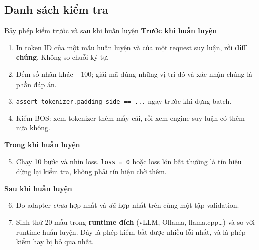 \subsection{Danh sách kiểm tra}
\label{ssec:boundary_checklist}

\begin{checklist}{Bảy phép kiểm trước và sau khi huấn luyện}
\textbf{Trước khi huấn luyện}
\begin{enumerate}
	\item In token ID của một mẫu huấn luyện và của một request suy luận, rồi \textbf{diff chúng}. Không so chuỗi ký tự.
	\item Đếm số nhãn khác $-100$; giải mã đúng những vị trí đó và xác nhận chúng là phần đáp án.
	\item \texttt{assert tokenizer.padding\_side == ...} ngay trước khi dựng batch.
	\item Kiểm BOS: xem tokenizer thêm mấy cái, rồi xem engine suy luận có thêm nữa không.
\end{enumerate}
\textbf{Trong khi huấn luyện}
\begin{enumerate}\setcounter{enumi}{4}
	\item Chạy 10 bước và nhìn loss. \texttt{loss = 0} hoặc loss lớn bất thường là tín hiệu dừng lại kiểm tra, không phải tín hiệu chờ thêm.
\end{enumerate}
\textbf{Sau khi huấn luyện}
\begin{enumerate}\setcounter{enumi}{5}
	\item Đo adapter \emph{chưa} hợp nhất và \emph{đã} hợp nhất trên cùng một tập validation.
	\item Sinh thử 20 mẫu trong \textbf{runtime đích} (vLLM, Ollama, llama.cpp\dots) và so với runtime huấn luyện. Đây là phép kiểm bắt được nhiều lỗi nhất, và là phép kiểm hay bị bỏ qua nhất.
\end{enumerate}
\end{checklist}
